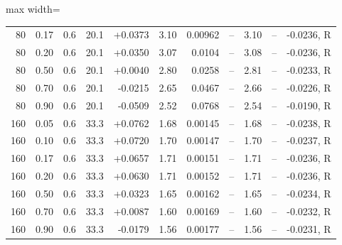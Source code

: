 \documentclass[11pt,letterpaper,fleqn]{article}
\begin{document}
\begin{table}[p]
\begin{adjustbox}{max width=\textwidth}
\begin{tabular}{@{}rrrrrrrrrrc@{}}
80 & 0.17 & 0.6 & 20.1 & +0.0373 & 3.10 & 0.00962 & -- & 3.10 & -- & -0.0236, R\\
80 & 0.20 & 0.6 & 20.1 & +0.0350 & 3.07 & 0.0104 & -- & 3.08 & -- & -0.0236, R\\
80 & 0.50 & 0.6 & 20.1 & +0.0040 & 2.80 & 0.0258 & -- & 2.81 & -- & -0.0233, R\\
80 & 0.70 & 0.6 & 20.1 & -0.0215 & 2.65 & 0.0467 & -- & 2.66 & -- & -0.0226, R\\
80 & 0.90 & 0.6 & 20.1 & -0.0509 & 2.52 & 0.0768 & -- & 2.54 & -- & -0.0190, R\\
160 & 0.05 & 0.6 & 33.3 & +0.0762 & 1.68 & 0.00145 & -- & 1.68 & -- & -0.0238, R\\
160 & 0.10 & 0.6 & 33.3 & +0.0720 & 1.70 & 0.00147 & -- & 1.70 & -- & -0.0237, R\\
160 & 0.17 & 0.6 & 33.3 & +0.0657 & 1.71 & 0.00151 & -- & 1.71 & -- & -0.0236, R\\
160 & 0.20 & 0.6 & 33.3 & +0.0630 & 1.71 & 0.00152 & -- & 1.71 & -- & -0.0236, R\\
160 & 0.50 & 0.6 & 33.3 & +0.0323 & 1.65 & 0.00162 & -- & 1.65 & -- & -0.0234, R\\
160 & 0.70 & 0.6 & 33.3 & +0.0087 & 1.60 & 0.00169 & -- & 1.60 & -- & -0.0232, R\\
160 & 0.90 & 0.6 & 33.3 & -0.0179 & 1.56 & 0.00177 & -- & 1.56 & -- & -0.0231, R\\
\bottomrule\end{tabular}\end{adjustbox}\end{table}
\end{document}
